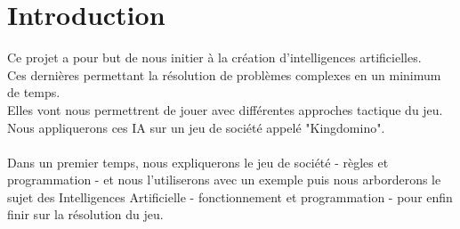 
\chapter{Introduction} %

\label{Chapter1} %


\newcommand{\keyword}[1]{\textbf{#1}}
\newcommand{\tabhead}[1]{\textbf{#1}}
\newcommand{\code}[1]{\texttt{#1}}
\newcommand{\file}[1]{\texttt{\bfseries#1}}
\newcommand{\option}[1]{\texttt{\itshape#1}}


Ce projet a pour but de nous initier à la création d'intelligences artificielles.\\Ces dernières permettant la résolution de problèmes complexes en un minimum de temps.\\
Elles vont nous permettrent de jouer avec différentes approches tactique du jeu.\\
Nous appliquerons ces IA sur un jeu de société appelé "Kingdomino".\\ \\
Dans un premier temps, nous expliquerons le jeu de société - règles et programmation - et nous l'utiliserons avec un exemple puis nous arborderons le sujet des Intelligences Artificielle - fonctionnement et programmation - pour enfin finir sur la résolution du jeu.

